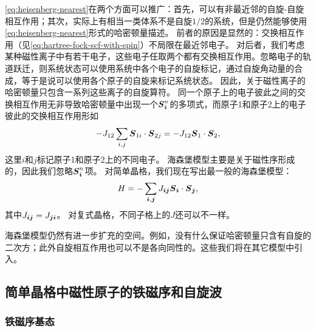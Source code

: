 \eqref{eq:heisenberg-nearest}在两个方面可以推广：首先，可以有非最近邻的自旋-自旋相互作用；其次，实际上有相当一类体系不是自旋$1/2$的系统，但是仍然能够使用\eqref{eq:heisenberg-nearest}形式的哈密顿量描述。
前者的原因是显然的：交换相互作用（见\eqref{eq:hartree-fock-scf-with-spin}）不局限在最近邻电子。
对后者，我们考虑某种磁性离子中有若干电子，这些电子任取两个都有交换相互作用。忽略电子的轨道跃迁，则系统状态可以使用系统中各个电子的自旋标记，通过自旋角动量的合成，等于是说可以使用各个原子的自旋来标记系统状态。
因此，关于磁性离子的哈密顿量只包含一系列这些离子的自旋算符。
同一个原子上的电子彼此之间的交换相互作用无非导致哈密顿量中出现一个$\vb*{S}_{\vb*{i}}^n$的多项式，而原子1和原子2上的电子彼此的交换相互作用形如
\[
    - J_{12} \sum_{i, j} \vb*{S}_{1i} \cdot \vb*{S}_{2j} = - J_{12} \vb*{S}_1 \cdot \vb*{S}_2,
\]
这里$i$和$j$标记原子1和原子2上的不同电子。
海森堡模型主要是关于磁性序形成的，因此我们忽略$\vb*{S}_{\vb*{i}}^n$项。
对简单晶格，我们现在写出最一般的海森堡模型：
\begin{equation}
    H = - \sum_{\vb*{i}, \vb*{j}} J_{\vb*{i} \vb*{j}} \vb*{S}_{\vb*{i}} \cdot \vb*{S}_{\vb*{j}},
\end{equation}
其中$J_{\vb*{i} \vb*{j}} = J_{\vb*{j} \vb*{i}}$。
对复式晶格，不同子格上的$J$还可以不一样。

海森堡模型仍然有进一步扩充的空间。例如，没有什么保证哈密顿量只含有自旋的二次方；此外自旋相互作用也可以不是各向同性的。这些我们将在其它模型中引入。

\subsection{简单晶格中磁性原子的铁磁序和自旋波}\label{sec:spin-wave}

\subsubsection{铁磁序基态}

